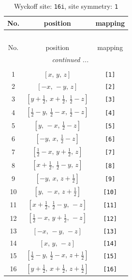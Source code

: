 \documentclass[fleqn,8pt]{jsarticle}
\begin{document}
\begin{longtable}{ccc}
\caption{Wyckoff site: {\tt 16i}, site symmetry: {\tt 1}}
 \\
 \hline \hline
No. & position & mapping \\ \hline \endfirsthead

\multicolumn{2}{l}{\tablename\ \thetable{}} \\
 \hline \hline
No. & position & mapping \\ \hline \endhead

 \hline \hline
\multicolumn{2}{r}{\footnotesize\it continued ...} \\ \endfoot

 \hline \hline
\multicolumn{2}{r}{} \\ \endlastfoot

1 & $\left[ x,\, y,\, z \right]$ & {\tt [1]} \\ \hline
2 & $\left[ - x,\, - y,\, z \right]$ & {\tt [2]} \\ \hline
3 & $\left[ y + \frac{1}{2},\, x + \frac{1}{2},\, \frac{1}{2} - z \right]$ & {\tt [3]} \\ \hline
4 & $\left[ \frac{1}{2} - y,\, \frac{1}{2} - x,\, \frac{1}{2} - z \right]$ & {\tt [4]} \\ \hline
5 & $\left[ y,\, - x,\, \frac{1}{2} - z \right]$ & {\tt [5]} \\ \hline
6 & $\left[ - y,\, x,\, \frac{1}{2} - z \right]$ & {\tt [6]} \\ \hline
7 & $\left[ \frac{1}{2} - x,\, y + \frac{1}{2},\, z \right]$ & {\tt [7]} \\ \hline
8 & $\left[ x + \frac{1}{2},\, \frac{1}{2} - y,\, z \right]$ & {\tt [8]} \\ \hline
9 & $\left[ - y,\, x,\, z + \frac{1}{2} \right]$ & {\tt [9]} \\ \hline
10 & $\left[ y,\, - x,\, z + \frac{1}{2} \right]$ & {\tt [10]} \\ \hline
11 & $\left[ x + \frac{1}{2},\, \frac{1}{2} - y,\, - z \right]$ & {\tt [11]} \\ \hline
12 & $\left[ \frac{1}{2} - x,\, y + \frac{1}{2},\, - z \right]$ & {\tt [12]} \\ \hline
13 & $\left[ - x,\, - y,\, - z \right]$ & {\tt [13]} \\ \hline
14 & $\left[ x,\, y,\, - z \right]$ & {\tt [14]} \\ \hline
15 & $\left[ \frac{1}{2} - y,\, \frac{1}{2} - x,\, z + \frac{1}{2} \right]$ & {\tt [15]} \\ \hline
16 & $\left[ y + \frac{1}{2},\, x + \frac{1}{2},\, z + \frac{1}{2} \right]$ & {\tt [16]} \\
\end{longtable}
\end{document}
